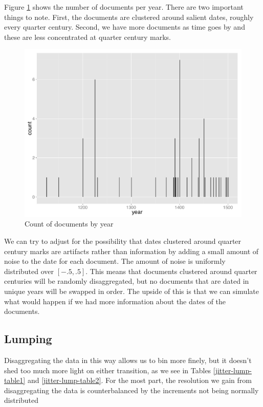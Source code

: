 Figure \ref{auth-plot} shows the number of documents per year. There are two important things to note. First, the documents are clustered around salient dates, roughly every quarter century. Second, we have more documents as time goes by and these are less concentrated at quarter century marks.

\begin{figure}
\centering
     \includegraphics[width=\textwidth]{auth-plot.pdf}
\caption{Count of documents by year}
\label{auth-plot}
\end{figure}

We can try to adjust for the possibility that dates clustered around quarter century marks are artifacts rather than information by adding a small amount of noise to the date for each document. The amount of noise is uniformly distributed over $[-.5, .5 ]$. This means that documents clustered around quarter centuries will be randomly disaggregated, but no documents that are dated in unique years will be swapped in order. The upside of this is that we can simulate what would happen if we had more information about the dates of the documents.

\subsection{Lumping}

Disaggregating the data in this way allows us to bin more finely, but it doesn't shed too much more light on either transition, as we see in Tables \ref{jitter-lump-table1} and \ref{jitter-lump-table2}. For the most part, the resolution we gain from disaggregating the data is counterbalanced by the increments not being normally distributed

